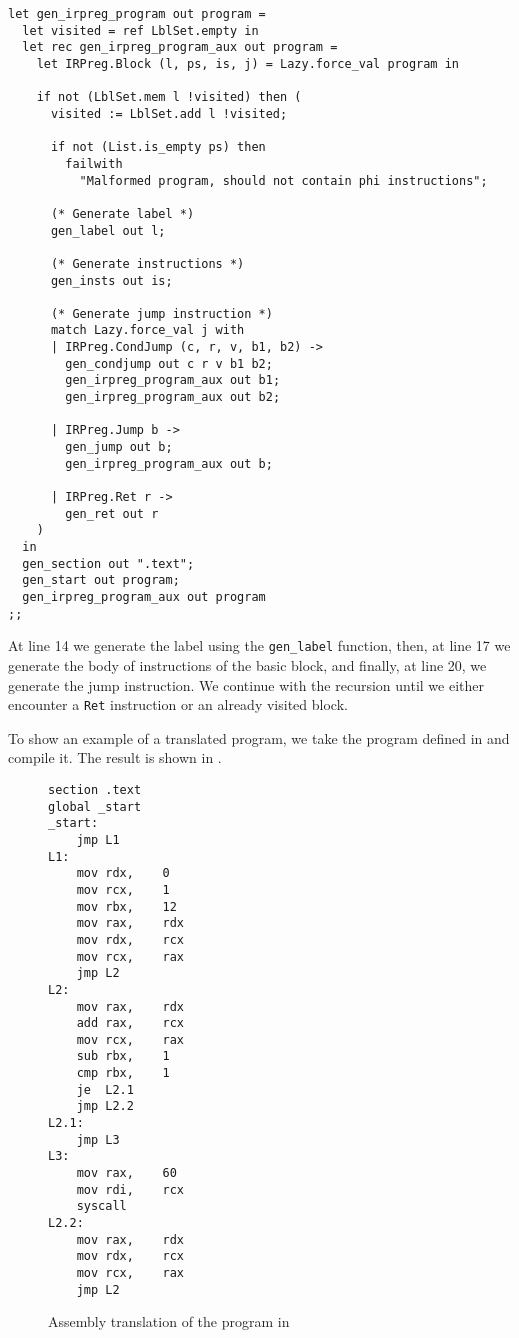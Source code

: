 \begin{lstlisting}[style=OCaml]
let gen_irpreg_program out program =
  let visited = ref LblSet.empty in
  let rec gen_irpreg_program_aux out program =
    let IRPreg.Block (l, ps, is, j) = Lazy.force_val program in

    if not (LblSet.mem l !visited) then (
      visited := LblSet.add l !visited;

      if not (List.is_empty ps) then
        failwith
          "Malformed program, should not contain phi instructions";

      (* Generate label *)
      gen_label out l;

      (* Generate instructions *)
      gen_insts out is;

      (* Generate jump instruction *)
      match Lazy.force_val j with
      | IRPreg.CondJump (c, r, v, b1, b2) ->
        gen_condjump out c r v b1 b2;
        gen_irpreg_program_aux out b1;
        gen_irpreg_program_aux out b2;

      | IRPreg.Jump b ->
        gen_jump out b;
        gen_irpreg_program_aux out b;

      | IRPreg.Ret r ->
        gen_ret out r
    )
  in
  gen_section out ".text";
  gen_start out program;
  gen_irpreg_program_aux out program
;;
\end{lstlisting}

At line 14 we generate the label using the \texttt{gen\_label} function, then, at line 17 we generate the body of instructions of the basic block, and finally, at line 20, we generate the jump instruction. We continue with the recursion until we either encounter a \texttt{Ret} instruction or an already visited block.

To show an example of a translated program, we take the program defined in  and compile it. The result is shown in .

\begin{figure}[ht]
\begin{lstlisting}[style=NASM]
section .text
global _start
_start:
	jmp	L1
L1:
	mov	rdx,	0
	mov	rcx,	1
	mov	rbx,	12
	mov	rax,	rdx
	mov	rdx,	rcx
	mov	rcx,	rax
	jmp	L2
L2:
	mov	rax,	rdx
	add	rax,	rcx
	mov	rcx,	rax
	sub	rbx,	1
	cmp	rbx,	1
	je	L2.1
	jmp	L2.2
L2.1:
	jmp	L3
L3:
	mov	rax,	60
	mov	rdi,	rcx
	syscall
L2.2:
	mov	rax,	rdx
	mov	rdx,	rcx
	mov	rcx,	rax
	jmp	L2
\end{lstlisting}
\caption{Assembly translation of the program in }
\label{fig:example-nasm}
\end{figure}